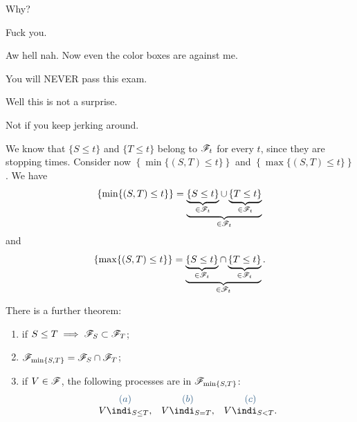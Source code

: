 \documentclass{report}
\begin{document}
Why?
\begin{remark}
	Fuck you.
\end{remark}
Aw hell nah. Now even the color boxes are against me. 
\begin{insult}
	You will NEVER pass this exam.
\end{insult}
Well this is not a surprise.
\begin{insult}
	Not if you keep jerking around.
\end{insult}
\begin{fancyproof}
	We know that $\{S\leq t\}$ and $\{T\leq t\}$ belong to $\mathscr{F}_t$ for every $t$, since they are stopping times. Consider now $\left\{\min\{(S,T)\leq t\}\right\}$ and $\left\{\max\{(S,T)\leq t\}\right\}$. We have
	\begin{equation*}
		\left\{\min\{(S,T)\leq t\}\right\}=\underbrace{\underbrace{\{S\leq t\}}_{\in\mathscr{F}_t}\cup\underbrace{\{T\leq t\}}_{\in\mathscr{F}_t}}_{\in\mathscr{F}_t}
	\end{equation*}
	and 
	\begin{equation*}
			\left\{\max\{(S,T)\leq t\}\right\}=\underbrace{\underbrace{\{S\leq t\}}_{\in\mathscr{F}_t}\cap\underbrace{\{T\leq t\}}_{\in\mathscr{F}_t}}_{\in\mathscr{F}_t}.
	\end{equation*}
\end{fancyproof}
There is a further theorem:
\begin{theorem}
	\begin{enumerate}[\circnum]
		\item if $S\leq T\implies\mathscr{F}_S\subset\mathscr{F}_T$;
		\item $\mathscr{F}_{\min\{S,T\}}=\mathscr{F}_S\cap\mathscr{F}_T$;
		\item if $V\in\mathscr{F}$, the following processes are in $\mathscr{F}_{\min\{S,T\}}$:
		\begin{equation*}
			\begin{array}{c c c}
				\color{SteelBlue4}(a)&\color{SteelBlue4}(b)&\color{SteelBlue4}(c)\\
				V\indi_{S\leq T},&V\indi_{S=T},&V\indi_{S< T}.
			\end{array}
		\end{equation*}
	\end{enumerate}
\end{theorem}
\end{document}
